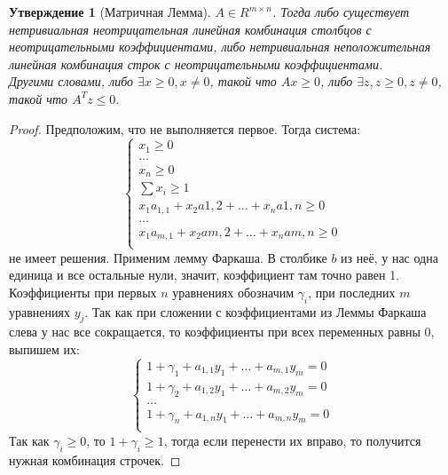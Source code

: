 \documentclass[12pt, letterpaper]{article}
\newtheorem{prop}{Утверждение}[section]
\begin{document}
\begin{prop}[Матричная Лемма]
$A \in R^{m \times n}$. Тогда либо существует нетривиальная неотрицательная линейная комбинация столбцов с неотрицательными коэффициентами, либо нетривиальная неположительная линейная комбинация строк с неотрицательными коэффициентами.\\
Другими словами, либо $\exists x \geq 0, x \neq 0$, такой что $Ax \geq 0$, либо $\exists z, z \geq 0, z \neq 0$, такой что $A^T z \leq 0$.
\end{prop}
\begin{proof}
Предположим, что не выполняется первое. Тогда система:
$$
\begin{cases}
x_1 \geq 0 \\
\ldots \\
x_n \geq 0 \\
\sum x_i \geq 1 \\
x_1 a_{1,1} + x_2 a{1, 2} + \ldots + x_n a{1, n} \geq 0 \\
\ldots \\
x_1 a_{m,1} + x_2 a{m,2} + \ldots + x_n a{m, n} \geq 0 \\
\end{cases}
$$
не имеет решения. Применим лемму Фаркаша. В столбике $b$ из неё, у нас одна единица и все остальные нули, значит, коэффициент там точно равен 1. Коэффициенты при первых $n$ уравнениях обозначим $\gamma_i$, при последних $m$ уравнениях $y_j$. Так как при сложении с коэффициентами из Леммы Фаркаша слева у нас все сокращается, то коэффициенты при всех переменных равны 0, выпишем их:
$$
\begin{cases}
1+\gamma_1 + a_{1,1} y_1 + \ldots + a_{m,1} y_m = 0 \\
1+\gamma_2 + a_{1,2} y_1 + \ldots + a_{m, 2} y_m = 0 \\
\ldots \\
1 +\gamma_n + a_{1,n} y_1 + \ldots + a_{m,n} y_m = 0\\
\end{cases}
$$
Так как $\gamma_i \geq 0$, то $1+\gamma_i \geq 1$, тогда если перенести их вправо, то получится нужная комбинация строчек.
\end{proof}
\end{document}
